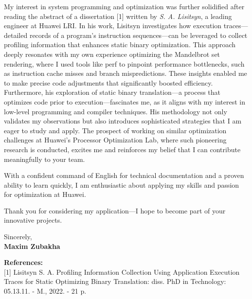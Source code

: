 \documentclass[11pt]{report}
\begin{document}
\begin{titlepage}
\begin{large}
\vspace{0.7em}

My interest in system programming and optimization was further solidified after reading the abstract of a dissertation [1] written by \textit{S. A. Lisitsyn}, a leading engineer at Huawei LRI. In his work, Lisitsyn investigates how execution traces—detailed records of a program’s instruction sequences—can be leveraged to collect profiling information that enhances static binary optimization. This approach deeply resonates with my own experience optimizing the Mandelbrot set rendering, where I used tools like perf to pinpoint performance bottlenecks, such as instruction cache misses and branch mispredictions. These insights enabled me to make precise code adjustments that significantly boosted efficiency. Furthermore, his exploration of static binary translation—a process that optimizes code prior to execution—fascinates me, as it aligns with my interest in low-level programming and compiler techniques. His methodology not only validates my observations but also introduces sophisticated strategies that I am eager to study and apply. The prospect of working on similar optimization challenges at Huawei’s Processor Optimization Lab, where such pioneering research is conducted, excites me and reinforces my belief that I can contribute meaningfully to your team.

\vspace{0.7em}

With a confident command of English for technical documentation and a proven ability to learn quickly, I am enthusiastic about applying my skills and passion for optimization at Huawei.

\vspace{0.7em}

Thank you for considering my application—I hope to become part of your innovative projects.

\vspace{0.7em}

\raggedright Sincerely,\\
\textbf{Maxim Zubakha}

\vspace{2.0em}

\textbf{References:} \\
\vspace{0.2em}
[1] Lisitsyn S. A. Profiling Information Collection Using Application Execution Traces for Static Optimizing Binary Translation: diss. PhD in Technology: 05.13.11. - M., 2022. - 21 p.

\end{large}

\end{titlepage}
\end{document}
